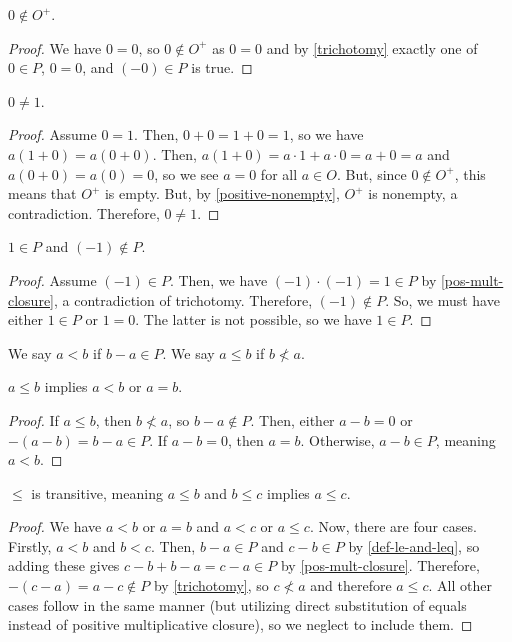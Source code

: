 \begin{lemma}\label{0-nonpos}
    $0 \notin O^+$.
\end{lemma}
\begin{proof}
    We have $0 = 0$, so $0 \notin O^+$ as $0 =0$ and by \ref{trichotomy} exactly one of $0 \in P$, $0 =0$, and $(-0) \in P$ is true.
\end{proof}

\begin{theorem}\label{0-neq-1}
    $0 \neq 1$.
\end{theorem}
\begin{proof}
Assume $0 = 1$. Then, $0+0 = 1+0 = 1$, so we have $a(1+0) = a (0+0)$. Then, $a(1+0) = a \cdot 1 + a \cdot 0 = a + 0 = a$ and $a(0+0) = a(0) = 0$, so we see $a =0$ for all $a \in O$. But, since $0 \notin O^+$, this means that $O^+$ is empty. But, by  \ref{positive-nonempty}, $O^+$ is nonempty, a contradiction. Therefore, $0 \neq 1$.
\end{proof}

\begin{theorem}[$1$ is positive]\label{1-pos}
    $1 \in P$ and $(-1) \notin P$.
\end{theorem}
\begin{proof}
    Assume $(-1) \in P$. Then, we have $(-1) \cdot (-1) = 1\in P$ by \ref{pos-mult-closure}, a contradiction of trichotomy. Therefore, $(-1) \notin P$. So, we must have either $1 \in P$ or $1=0$. The latter is not possible, so we have $1 \in P$.  
\end{proof}

\begin{definition}\label{def-le-and-leq}
    We say $a < b$ if $b-a \in P$. We say $a \le b$ if $b \nless a$. 
\end{definition}

\begin{theorem}\label{leq-le-or-eq}
    $a \le b$ implies $a<b$ or $a= b$.
\end{theorem}
\begin{proof}
    If $a \le b$, then $b \nless a$, so $b-a \notin P$. Then, either $a-b = 0$ or $-(a-b) = b-a \in P$. If $a-b=0$, then $a=b$. Otherwise, $a-b \in P$, meaning $a<b$. 
\end{proof}

\begin{theorem}\label{leq-transitive}
    $\le$ is transitive, meaning $a\le b$ and $b \le c$ implies $a \le c$.
\end{theorem}
\begin{proof}
We have $a<b$ or $a=b$ and $a<c$ or $a \le c$. Now, there are four cases. Firstly, $a<b$ and $b < c$. Then, $b-a \in P$ and $c-b \in P$ by \ref{def-le-and-leq}, so adding these gives $c-b + b-a = c-a \in P$ by \ref{pos-mult-closure}. Therefore, $-(c-a) = a-c \notin P$ by \ref{trichotomy}, so $c \nless a$ and therefore $a \le c$. All other cases follow in the same manner (but utilizing direct substitution of equals instead of positive multiplicative closure), so we neglect to include them.
\end{proof}


